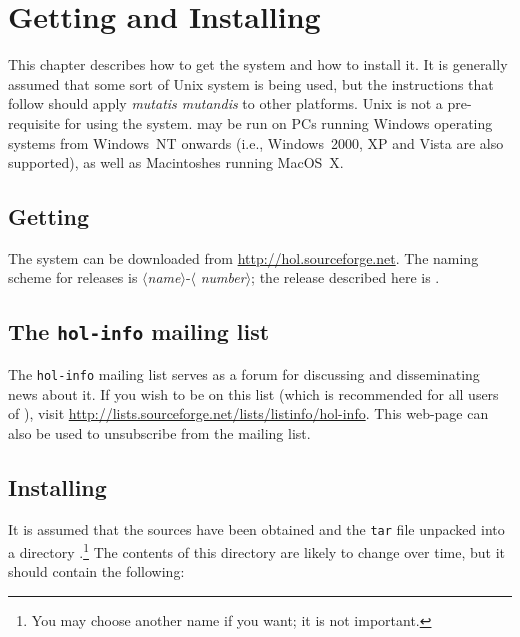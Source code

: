 \chapter{Getting and Installing \HOL{}}
\label{install}

This chapter describes how to get the \HOL{} system and how to install
it.  It is generally assumed that some sort of Unix system is being
used, but the instructions that follow should apply {\it mutatis
  mutandis\/} to other platforms.  Unix is not a pre-requisite for
using the system. \HOL{} may be run on PCs running Windows operating
systems from Windows~NT onwards (i.e., Windows~2000, XP and Vista are
also supported), as well as Macintoshes running MacOS~X.

\section{Getting \HOL{}}

The \HOL{} system can be downloaded from
\url{http://hol.sourceforge.net}.  The naming scheme for \holn{}
releases is $\langle${\it name}$\rangle$-$\langle${\it
  number}$\rangle$; the release described here is \holnversion.

\section{The {\tt hol-info} mailing list}

The \texttt{hol-info} mailing list serves as a forum for discussing
\HOL{} and disseminating news about it.  If you wish to be on this
list (which is recommended for all users of \HOL), visit
\url{http://lists.sourceforge.net/lists/listinfo/hol-info}.  This
web-page can also be used to unsubscribe from the mailing list.

\section{Installing \HOL{}}

It is assumed that the \HOL{} sources have been obtained and the
\texttt{tar} file unpacked into a directory .\footnote{You may
  choose another name if you want; it is not important.} The contents
of this directory are likely to change over time, but it should
contain the following:

